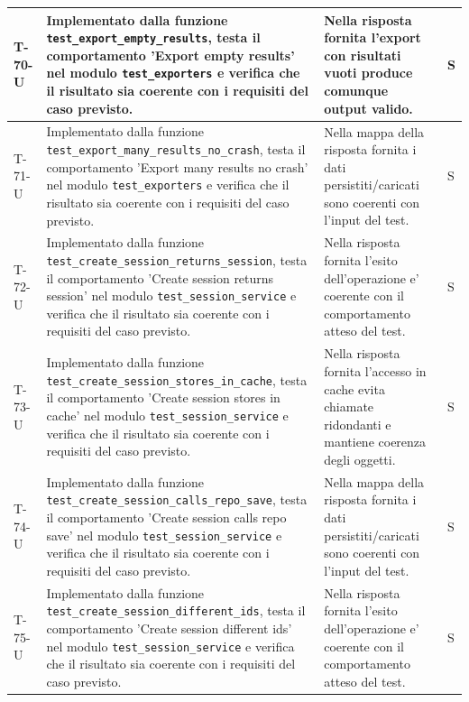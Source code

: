 \documentclass[a4paper,12pt]{article}
\begin{document}
{{\begin{longtable}{|>{\RaggedRight\arraybackslash}p{1.55cm}|>{\RaggedRight\arraybackslash}p{8.0cm}|>{\RaggedRight\arraybackslash}p{4.6cm}|>{\RaggedRight\arraybackslash}p{1.2cm}|}
        \hline
        T-70-U & Implementato dalla funzione \texttt{test\_\allowbreak export\_\allowbreak empty\_\allowbreak results}, testa il comportamento 'Export empty results' nel modulo \texttt{test\_\allowbreak exporters} e verifica che il risultato sia coerente con i requisiti del caso previsto. & Nella risposta fornita l'export con risultati vuoti produce comunque output valido. & S \\
        \hline
        T-71-U & Implementato dalla funzione \texttt{test\_\allowbreak export\_\allowbreak many\_\allowbreak results\_\allowbreak no\_\allowbreak crash}, testa il comportamento 'Export many results no crash' nel modulo \texttt{test\_\allowbreak exporters} e verifica che il risultato sia coerente con i requisiti del caso previsto. & Nella mappa della risposta fornita i dati persistiti/caricati sono coerenti con l'input del test. & S \\
        \hline
        T-72-U & Implementato dalla funzione \texttt{test\_\allowbreak create\_\allowbreak session\_\allowbreak returns\_\allowbreak session}, testa il comportamento 'Create session returns session' nel modulo \texttt{test\_\allowbreak session\_\allowbreak service} e verifica che il risultato sia coerente con i requisiti del caso previsto. & Nella risposta fornita l'esito dell'operazione e' coerente con il comportamento atteso del test. & S \\
        \hline
        T-73-U & Implementato dalla funzione \texttt{test\_\allowbreak create\_\allowbreak session\_\allowbreak stores\_\allowbreak in\_\allowbreak cache}, testa il comportamento 'Create session stores in cache' nel modulo \texttt{test\_\allowbreak session\_\allowbreak service} e verifica che il risultato sia coerente con i requisiti del caso previsto. & Nella risposta fornita l'accesso in cache evita chiamate ridondanti e mantiene coerenza degli oggetti. & S \\
        \hline
        T-74-U & Implementato dalla funzione \texttt{test\_\allowbreak create\_\allowbreak session\_\allowbreak calls\_\allowbreak repo\_\allowbreak save}, testa il comportamento 'Create session calls repo save' nel modulo \texttt{test\_\allowbreak session\_\allowbreak service} e verifica che il risultato sia coerente con i requisiti del caso previsto. & Nella mappa della risposta fornita i dati persistiti/caricati sono coerenti con l'input del test. & S \\
        \hline
        T-75-U & Implementato dalla funzione \texttt{test\_\allowbreak create\_\allowbreak session\_\allowbreak different\_\allowbreak ids}, testa il comportamento 'Create session different ids' nel modulo \texttt{test\_\allowbreak session\_\allowbreak service} e verifica che il risultato sia coerente con i requisiti del caso previsto. & Nella risposta fornita l'esito dell'operazione e' coerente con il comportamento atteso del test. & S \\

\end{longtable}}}
\end{document}
